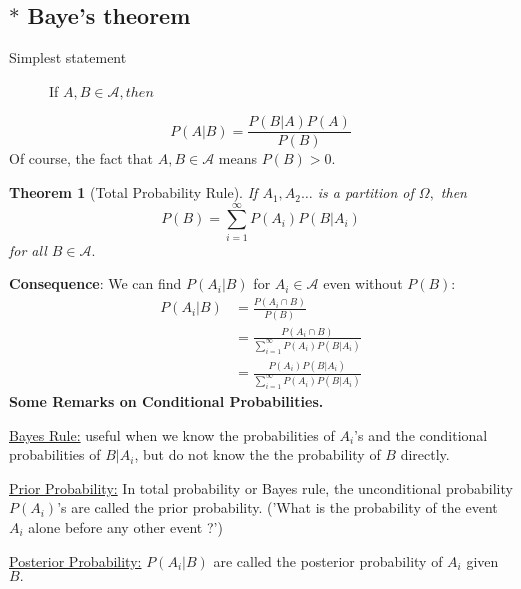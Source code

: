 \documentclass[12pt]{report} \addtolength{\textheight}{2in}
\newtheorem{thm}{Theorem}
\newcommand{\bigA}{\mathcal{A}}
\newcommand{\infsum}{\sum_{i=1}^{\infty}}
\begin{document}
\subsection*{{\Large $\ast$} Baye's theorem}
\begin{description}
\item[Simplest statement] If $A,B \in \mathcal{A}, then$
\end{description}
\begin{displaymath}
P(A|B)=\frac{P(B|A)P(A)}{P(B)}
\end{displaymath}
Of course, the fact that $A,B \in \mathcal{A}$ means $P(B) > 0.$
\begin{thm}[Total Probability Rule]
If $A_1,A_2\dots$ is a partition of $\Omega,$ then
\begin{displaymath}
P(B)=\infsum P(A_i)P(B|A_i)
\end{displaymath}
for all $B \in \bigA.$
\end{thm}
\textbf{Consequence}: We can find $P(A_i|B)$ for $A_i\in\bigA$ even without $P(B):$
\begin{align*}
P(A_i|B)&=\frac{P(A_i\cap B)}{P(B)}\\
&=\frac{P(A_i \cap B)}{\infsum P(A_i) P(B|A_i)}\\
&=\frac{P(A_i)P(B|A_i)}{\infsum P(A_i) P(B|A_i)}
\end{align*}
\newpage
\textbf{Some Remarks on Conditional Probabilities.}\\
\begin{description}
\item{\underline{Bayes Rule:}} useful when we know the probabilities of $A_i$'s  and the conditional probabilities of $B|A_i$, but do not know the the probability of $B$ directly.
\item{\underline{Prior Probability:}} In total probability or Bayes rule, the unconditional probability $P(A_i)$'s are called the prior probability. ('What is the probability of the event $A_i$ alone before any other event ?')
\item{\underline{Posterior Probability:}} $P(A_i|B)$ are called the posterior probability of $A_i$ given $B.$ 
\end{description}
\end{document}
